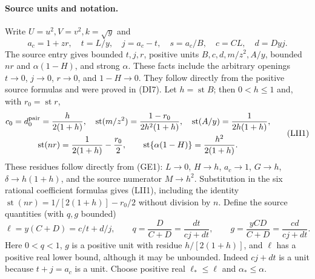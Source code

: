 \paragraph{Source units and notation.}
Write $U=u^2,V=v^2,k=\sqrt y$ and
\[
 a_c=1+zr,\quad t=L/y,\quad j=a_c-t,\quad s=a_c/B,
 \quad c=CL,\quad d=Dyj.
\]
The source entry gives bounded $t,j,r$, positive units $B,c,d,m/z^2,A/y$,
bounded $nr$ and $\alpha(1-H)$, and strong $\alpha$.
These facts include the arbitrary openings $t\to0$, $j\to0$,
$r\to0$, and $1-H\to0$.  They follow directly from the positive
source formulas and were proved in (DI7).  Let $h=\operatorname{st}B$;
then $0<h\leq1$ and, with $r_0=\operatorname{st}r$,
\[
\begin{gathered}
 c_0=d_0^{\rm pair}=\frac{h}{2(1+h)},\quad
 \operatorname{st}(m/z^2)=\frac{1-r_0}{2h^2(1+h)},\quad
 \operatorname{st}(A/y)=\frac1{2h(1+h)},\\
 \operatorname{st}(nr)=\frac1{2(1+h)}-\frac{r_0}{2},\qquad
 \operatorname{st}\{\alpha(1-H)\}=\frac{h^2}{2(1+h)}.
\end{gathered}
\tag{LII1}
\]
These residues follow directly from (GE1): $L\to0$, $H\to h$,
$a_c\to1$, $G\to h$, $\delta\to h(1+h)$, and the source
numerator $M\to h^2$.  Substitution in the six rational coefficient
formulas gives (LII1), including the identity
$\operatorname{st}(nr)=1/[2(1+h)]-r_0/2$ without division by $n$.
Define the source quantities (with $q,g$ bounded)
\[
 \ell=y(C+D)=c/t+d/j,\qquad
 q=\frac{D}{C+D}=\frac{dt}{cj+dt},\qquad
 g=\frac{yCD}{C+D}=\frac{cd}{cj+dt}.
\]
Here $0<q<1$, $g$ is a positive unit with residue $h/[2(1+h)]$,
and $\ell$ has a positive real lower bound, although it may be
unbounded.  Indeed $cj+dt$ is a unit because $t+j=a_c$ is a unit.
Choose positive real $\ell_*\leq\ell$ and
$\alpha_*\leq\alpha$.

